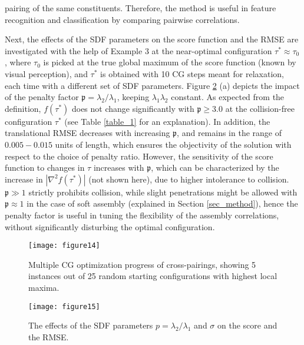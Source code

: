 \documentclass[article]{gmp2014}
\theoremstyle{definition}
\begin{document}
pairing of the same constituents. Therefore, the method is useful in feature recognition and classification by comparing pairwise correlations.

Next, the effects of the SDF parameters on the score function and the RMSE are investigated with the help of Example 3 at the near-optimal configuration $\tau^\ast \approx \tau_0$, where $\tau_0$ is picked at the true global maximum of the score function (known by visual perception), and $\tau^\ast$ is obtained with 10 CG steps meant for relaxation, each time with a different set of SDF parameters. Figure \ref{figure15} (a) depicts the impact of the penalty factor $\mathfrak{p} = \lambda_2 / \lambda_1$, keeping $\lambda_1 \lambda_2$ constant. As expected from the definition, $f(\tau^\ast)$ does not change significantly with $\mathfrak{p} \geq 3.0$ at the collision-free configuration $\tau^\ast$ (see Table \ref{table_1} for an explanation). In addition, the translational RMSE decreases with increasing $\mathfrak{p}$, and remains in the range of $0.005-0.015$ units of length, which ensures the objectivity of the solution with respect to the choice of penalty ratio. However, the sensitivity of the score function to changes in $\tau$ increases with $\mathfrak{p}$, which can be characterized by the increase in $|\nabla^2 f(\tau^\ast)|$ (not shown here), due to higher intolerance to collision. $\mathfrak{p} \gg 1$ strictly prohibits collision, while slight penetrations might be allowed with $\mathfrak{p} \approx 1$ in the case of soft assembly (explained in Section \ref{sec_method}), hence the penalty factor is useful in tuning the flexibility of the assembly correlations, without significantly disturbing the optimal configuration.

%
\begin{figure}
    \centering
    \texttt{[image: figure14]}
    \caption{Multiple CG optimization progress of cross-pairings, showing 5 instances out of 25 random starting configurations with highest local maxima.} \label{figure14}
\end{figure}
%

%
\begin{figure}
    \centering
    \texttt{[image: figure15]}
    \caption{The effects of the SDF parameters $p = \lambda_2/ \lambda_1$ and $\sigma$ on the score and the RMSE.} \label{figure15}
\end{figure}
%
\end{document}
